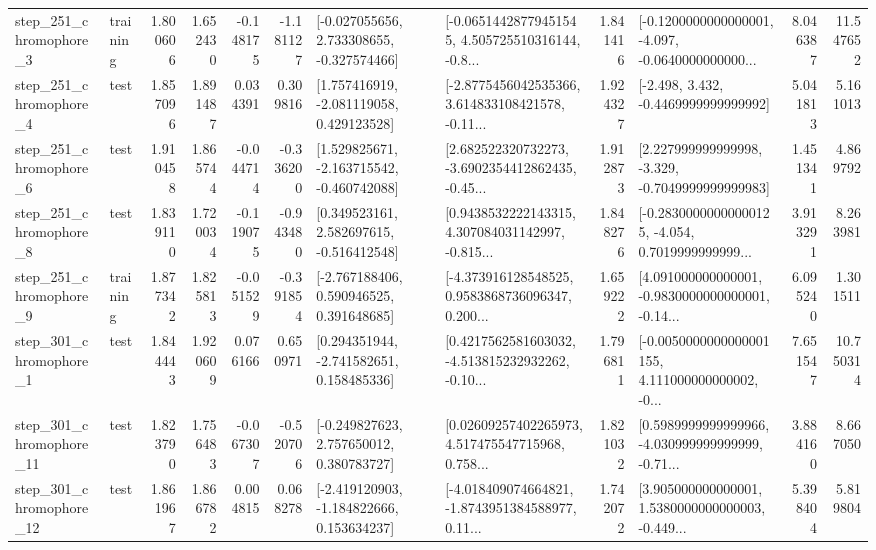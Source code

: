 \begin{tabular}{llrrrrllrlrr}
   step\_251\_chromophore\_3 &  training &      1.800606 &    1.652430 &     -0.148175 & -1.181127 &   [-0.027055656, 2.733308655, -0.327574466] &  [-0.06514428779451545, 4.505725510316144, -0.8... &       1.841416 &  [-0.1200000000000001, -4.097, -0.0640000000000... &            8.046387 &         11.547652 \\
   step\_251\_chromophore\_4 &      test &      1.857096 &    1.891487 &      0.034391 &  0.309816 &    [1.757416919, -2.081119058, 0.429123528] &  [-2.8775456042535366, 3.614833108421578, -0.11... &       1.924327 &               [-2.498, 3.432, -0.4469999999999992] &            5.041813 &          5.161013 \\
   step\_251\_chromophore\_6 &      test &      1.910458 &    1.865744 &     -0.044714 & -0.336200 &   [1.529825671, -2.163715542, -0.460742088] &  [2.682522320732273, -3.6902354412862435, -0.45... &       1.912873 &   [2.227999999999998, -3.329, -0.7049999999999983] &            1.451341 &          4.869792 \\
   step\_251\_chromophore\_8 &      test &      1.839110 &    1.720034 &     -0.119075 & -0.943480 &    [0.349523161, 2.582697615, -0.516412548] &  [0.9438532222143315, 4.307084031142997, -0.815... &       1.848276 &  [-0.28300000000000125, -4.054, 0.7019999999999... &            3.913291 &          8.263981 \\
   step\_251\_chromophore\_9 &  training &      1.877342 &    1.825813 &     -0.051529 & -0.391854 &    [-2.767188406, 0.590946525, 0.391648685] &  [-4.373916128548525, 0.9583868736096347, 0.200... &       1.659222 &  [4.091000000000001, -0.9830000000000001, -0.14... &            6.095240 &          1.301511 \\
   step\_301\_chromophore\_1 &      test &      1.844443 &    1.920609 &      0.076166 &  0.650971 &    [0.294351944, -2.741582651, 0.158485336] &  [0.4217562581603032, -4.513815232932262, -0.10... &       1.796811 &  [-0.0050000000000001155, 4.111000000000002, -0... &            7.651547 &         10.750314 \\
  step\_301\_chromophore\_11 &      test &      1.823790 &    1.756483 &     -0.067307 & -0.520706 &    [-0.249827623, 2.757650012, 0.380783727] &  [0.02609257402265973, 4.517475547715968, 0.758... &       1.821032 &  [0.5989999999999966, -4.030999999999999, -0.71... &            3.884160 &          8.667050 \\
  step\_301\_chromophore\_12 &      test &      1.861967 &    1.866782 &      0.004815 &  0.068278 &   [-2.419120903, -1.184822666, 0.153634237] &  [-4.018409074664821, -1.8743951384588977, 0.11... &       1.742072 &  [3.905000000000001, 1.5380000000000003, -0.449... &            5.398404 &          5.819804 \\

\end{tabular}
